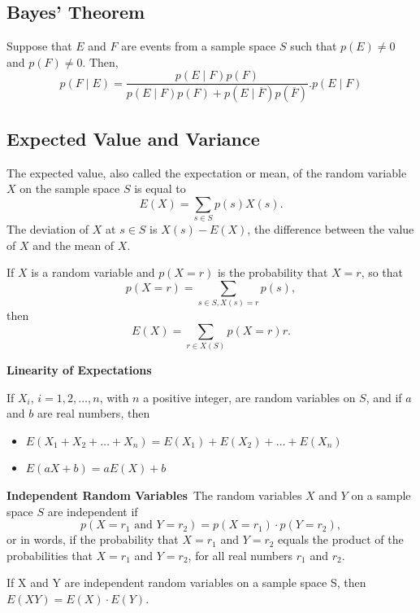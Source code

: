 \documentclass{article}
\begin{document}
\subsection{Bayes' Theorem}
\begin{theorem}
    Suppose that \( E \) and \( F \) are events from a sample space \( S \) such that \( p(E) \neq 0 \) and \( p(F) \neq 0 \). Then,
    \[
    p(F \mid E) = \frac{p(E \mid F)p(F)}{p(E \mid F)p(F) + p(E \mid \overline{F})p(\overline{F})} . p(E \mid F)
    \]
\end{theorem}
\subsection{Expected Value and Variance}
\begin{definition}
    The expected value, also called the expectation or mean, of the random variable \( X \) on the sample space \( S \) is equal to
    \[
    E(X) = \sum_{s \in S} p(s) X(s).
    \]
    The deviation of \( X \) at \( s \in S \) is \( X(s) - E(X) \), the difference between the value of \( X \) and the mean of \( X \).
\end{definition}
\begin{theorem}
    If \( X \) is a random variable and \( p(X = r) \) is the probability that \( X = r \), so that
    \[
    p(X = r) = \sum_{s \in S, X(s) = r} p(s),
    \]
    then
    \[
    E(X) = \sum_{r \in X(S)} p(X = r) r.
    \]
\end{theorem}
\begin{theorem}
    \textbf{Linearity of Expectations}

    If \( X_i \), \( i = 1, 2, \dots, n \), with \( n \) a positive integer, are random variables on \( S \), and if \( a \) and \( b \) are real numbers, then
    \begin{itemize}
        \item[(i)] \( E(X_1 + X_2 + \dots + X_n) = E(X_1) + E(X_2) + \dots + E(X_n) \)
        \item[(ii)] \( E(aX + b) = aE(X) + b \)
    \end{itemize}

\end{theorem}
\begin{definition}
    \textbf{Independent Random Variables}\
    The random variables \( X \) and \( Y \) on a sample space \( S \) are independent if
    \[
    p(X = r_1 \text{ and } Y = r_2) = p(X = r_1) \cdot p(Y = r_2),
    \]
    or in words, if the probability that \( X = r_1 \) and \( Y = r_2 \) equals the product of the probabilities that \( X = r_1 \) and \( Y = r_2 \), for all real numbers \( r_1 \) and \( r_2 \).
\end{definition}
\begin{theorem}
    If X and Y are independent random variables on a sample space S, then \(E(XY) = E(X) \cdot E(Y)\).
\end{theorem}
\end{document}
